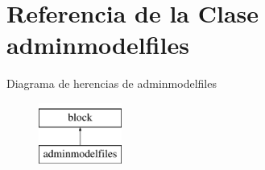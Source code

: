 \hypertarget{classadminmodelfiles}{}\section{Referencia de la Clase adminmodelfiles}
\label{classadminmodelfiles}
Diagrama de herencias de adminmodelfiles\begin{figure}[H]
\begin{center}
\leavevmode
\includegraphics[height=2.000000cm]{classadminmodelfiles}
\end{center}
\end{figure}
